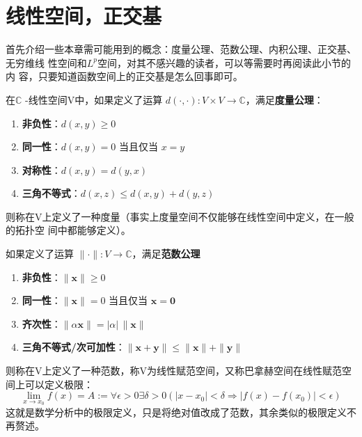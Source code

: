 \documentclass{ctexbook}
\begin{document}
\section{线性空间，正交基}\label{sec:Linear_Space}
首先介绍一些本章需可能用到的概念：度量公理、范数公理、内积公理、正交基、无穷维线
性空间和$L^p$空间，对其不感兴趣的读者，可以等需要时再阅读此小节的内
容，只要知道函数空间上的正交基是怎么回事即可。

在$\mathbb{C}$ -线性空间V中，如果定义了运算
$d(\cdot,\cdot):V\times V\rightarrow \mathbb{C}  $，满足\textbf{度量公理}：
\begin{enumerate}
    \item \textbf{非负性}：$d(x, y) \geq 0$
    \item \textbf{同一性}：$d(x, y) = 0$ 当且仅当 $x = y$
    \item \textbf{对称性}：$d(x, y) = d(y, x)$
    \item \textbf{三角不等式}：$d(x, z) \leq d(x, y) + d(y, z)$
\end{enumerate}
则称在V上定义了一种度量（事实上度量空间不仅能够在线性空间中定义，在一般的拓扑空
间中都能够定义）。

如果定义了运算
$\|\cdot \| :V\rightarrow \mathbb{C} $，满足\textbf{范数公理}
\begin{enumerate}
    \item \textbf{非负性}：$\|\mathbf{x}\| \geq 0$
    \item \textbf{同一性}：$\|\mathbf{x}\| = 0$ 当且仅当 $\mathbf{x} = \mathbf{0}$
    \item \textbf{齐次性}：$\|\alpha \mathbf{x}\| = |\alpha| \, \|\mathbf{x}\|$
    \item \textbf{三角不等式/次可加性}：$\|\mathbf{x} + \mathbf{y}\| \leq \|\mathbf{x}\| + \|\mathbf{y}\|$
\end{enumerate}
则称在V上定义了一种范数，称V为线性赋范空间，又称巴拿赫空间在线性赋范空间上可以定义极限：
\[\lim_{x \to x_0} f(x)=A:=\forall \epsilon>0\exists \delta>0(|x-x_0|<\delta\Rightarrow |f(x)-f(x_0)|<\epsilon) \]
这就是数学分析中的极限定义，只是将绝对值改成了范数，其余类似的极限定义不再赘述。
\end{document}
